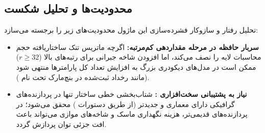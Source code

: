 \subsection{محدودیت‌ها و تحلیل شکست}
تحلیل رفتار و سازوکار فشرده‌سازی این ماژول محدودیت‌های زیر را برجسته می‌سازد:
\begin{itemize}
    \item \textbf{سربار حافظه در مرحله مقداردهی کم‌مرتبه:} اگرچه ماتریس تنک ساختاریافته حجم محاسبات لایه را نصف می‌کند، اما افزودن شاخه جبرانی  برای رتبه‌های بالا ($r \ge 32$) ممکن است در مدل‌های دیکودری بزرگ به افزایش تعداد کل پارامترها منتهی شود (مانند رخداد ثبت‌شده در بنچ‌مارک  تحت نام ).
    \item \textbf{نیاز به پشتیبانی سخت‌افزاری :} شتاب‌بخشی خطی ساختار  تنها در پردازنده‌های گرافیکی دارای معماری  و جدیدتر (از طریق دستورات ) محقق می‌شود؛ در پردازنده‌های قدیمی‌تر، هزینه نگهداری ماسک و شاخه‌های موازی می‌تواند باعث افت جزئی توان پردازش گردد.
\end{itemize}
